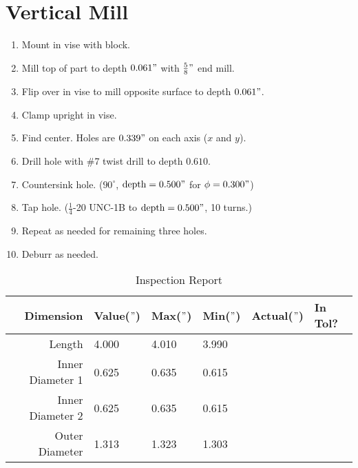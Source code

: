 \documentclass{article}
\begin{document}
\section*{Vertical Mill}

\begin{enumerate}[resume]
	\item Mount in vise with block.

	\item Mill top of part to depth $0.061"$ with $\frac{5}{8}"$ end mill.

	\item Flip over in vise to mill opposite surface to depth $0.061"$.

	\item Clamp upright in vise.

	\item Find center.  Holes are $0.339"$ on each axis ($x$ and $y$).

	\item Drill hole with \#7 twist drill to depth $0.610$.

	\item Countersink hole.  ($90^\circ$, $\text{depth} = 0.500"$ for $\phi = 0.300"$)

	\item Tap hole.  ($\frac{1}{4}$-20 UNC-1B to $\text{depth} = 0.500"$, 10 turns.)

	\item Repeat as needed for remaining three holes.

	\item Deburr as needed.
\end{enumerate}

\newpage

\begin{table}[ht]
\centering
\caption{Inspection Report}
\renewcommand\arraystretch{3}
\begin{tabular}{r | m{2cm} | m{2cm} | m{2cm} | m{2cm} | m{2cm} |}
	Dimension & Value($"$) & Max($"$) & Min($"$) & Actual($"$) & In Tol? \\
	\hline
	Length & 4.000 & 4.010 & 3.990 & & \\
	\hline
	Inner Diameter 1 & 0.625 & 0.635 & 0.615 & & \\
	\hline
	Inner Diameter 2 & 0.625 & 0.635 & 0.615 & & \\
	\hline
	Outer Diameter & 1.313 & 1.323 & 1.303 & & \\
	\hline
\end{tabular}
\end{table}
\end{document}
